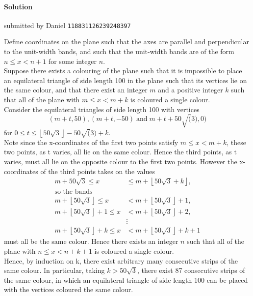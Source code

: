 \documentclass[10pt]{article}
\newcommand{\floor}[1]{\left \lfloor #1 \right \rfloor}
\newcommand{\themonth}{March}
\newcounter{solution}
\newcounter{datenumber}
\newcommand{\solution}[4][0]{
	\paragraph{Solution \arabic{solution}} \hfill submitted by #2 \hfill \texttt{#3}
	\begin{flushleft} #4 \end{flushleft}
	\addtocounter{solution}{1}
	\vspace{1em}
}
\begin{document}
\solution[6]{Daniel}{118831126239248397}{Define coordinates on the plane such that the axes are parallel and perpendicular to the unit-width bands, and such that the unit-width bands are of the form \(n \leq x < n+1\) for some integer \(n\). \\
	
	Suppose there exists a colouring of the plane such that it is impossible to place an equilateral triangle of side length 100 in the plane such that its vertices lie on the same colour, and that there exist an integer \(m\) and a positive integer \(k\) such that all of the plane with \(m \leq x < m + k\) is coloured a single colour.\\
	
	Consider the equilateral triangles of side length 100 with vertices \[(m+t,50), (m+t,-50) \mathop{\text{and}} m+t+50\sqrt(3), 0)\] for \(0 \leq t \leq  \floor{50\sqrt{3}} - 50\sqrt(3) + k\). \\
	
	Note since the x-coordinates of the first two points satisfy \(m \leq x < m + k\), these two points, as t varies, all lie on the same colour. Hence the third points, as t varies, must all lie on the opposite colour to the first two points. However the x-coordinates of the third points takes on the values  
	\begin{align*}
	m + 50\sqrt{3} \leq x &\leq m + \floor{50\sqrt{3}+k},\\
	\text{so the bands}\\
	m + \floor{50\sqrt{3}} \leq x &< m + \floor{50\sqrt{3}} + 1,\\
	m + \floor{50\sqrt{3}} + 1 \leq x &< m + \floor{50\sqrt{3}} + 2,\\
	&\vdots\\
	m + \floor{50\sqrt{3}} + k \leq x &< m + \floor{50\sqrt{3}} + k + 1
	\end{align*}
	must all be the same colour. Hence there exists an integer \(n\) such that all of the plane with \(n \leq x < n + k + 1\) is coloured a single colour.\\
	
	Hence, by induction on k, there exist arbitrary many consecutive strips of the same colour. In particular, taking \(k > 50\sqrt{3}\), there exist 87 consecutive strips of the same colour, in which an equilateral triangle of side length 100 can be placed with the vertices coloured the same colour.}

\renewcommand{\themonth}{April}
\setcounter{datenumber}{1}
\end{document}
